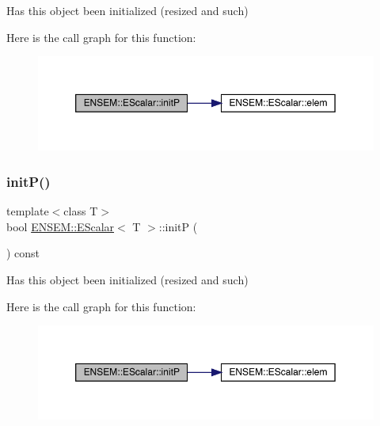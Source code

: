 Has this object been initialized (resized and such) 

Here is the call graph for this function\+:
\nopagebreak
\begin{figure}[H]
\begin{center}
\leavevmode
\includegraphics[width=350pt]{d0/d82/classENSEM_1_1EScalar_ac5b2f0fbee6aa61f80bcd2d0b4d5188c_cgraph}
\end{center}
\end{figure}
\mbox{\label{classENSEM_1_1EScalar_ac5b2f0fbee6aa61f80bcd2d0b4d5188c}} 
\subsubsection{\texorpdfstring{initP()}{initP()}\hspace{0.1cm}{\footnotesize\ttfamily [2/2]}}
{\footnotesize\ttfamily template$<$class T$>$ \\
bool \mbox{\hyperlink{classENSEM_1_1EScalar}{E\+N\+S\+E\+M\+::\+E\+Scalar}}$<$ T $>$\+::initP (\begin{DoxyParamCaption}{ }\end{DoxyParamCaption}) const\hspace{0.3cm}{\ttfamily [inline]}}



Has this object been initialized (resized and such) 

Here is the call graph for this function\+:
\nopagebreak
\begin{figure}[H]
\begin{center}
\leavevmode
\includegraphics[width=350pt]{d0/d82/classENSEM_1_1EScalar_ac5b2f0fbee6aa61f80bcd2d0b4d5188c_cgraph}
\end{center}
\end{figure}
\mbox{\label{classENSEM_1_1EScalar_a63584568dc8b1817a57656cc072205b2}} 
